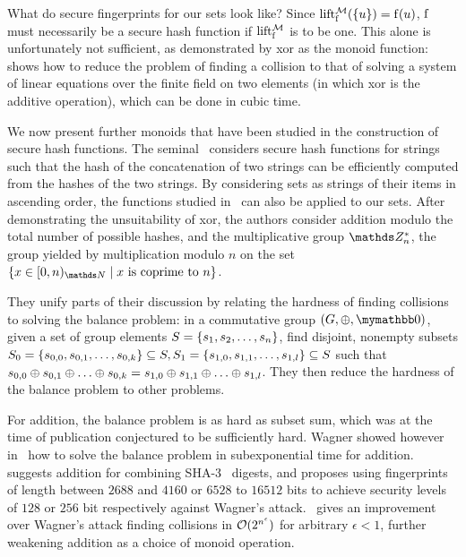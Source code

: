 \documentclass[conference]{IEEEtran}
\begin{document}
What do secure fingerprints for our sets look like? Since $\operatorname{lift_{\operatorname{f}}^{\mathcal{M}}}(\{u\}) = \operatorname{f}(u)$, $\operatorname{f}$ must necessarily be a secure hash function if $\operatorname{lift_{\operatorname{f}}^{\mathcal{M}}}$ is to be one. This alone is unfortunately not sufficient, as demonstrated by xor as the monoid function:~\cite{bellare1997new} shows how to reduce the problem of finding a collision to that of solving a system of linear equations over the finite field on two elements (in which xor is the additive operation), which can be done in cubic time.

We now present further monoids that have been studied in the construction of secure hash functions. The seminal~\cite{bellare1997new} considers secure hash functions for strings such that the hash of the concatenation of two strings can be efficiently computed from the hashes of the two strings. By considering sets as strings of their items in ascending order, the functions studied in~\cite{bellare1997new} can also be applied to our sets. After demonstrating the unsuitability of xor, the authors consider addition modulo the total number of possible hashes, and the multiplicative group $\Z_n^\ast$, the group yielded by multiplication modulo $n$ on the set $\set{x \in \range{0}{n}{\N} \mid \text{$x$ is coprime to $n$}}$.

They unify parts of their discussion by relating the hardness of finding collisions to solving the balance problem: in a commutative group $(G, \groupaddsym, \neutraladd)$, given a set of group elements $S = \{s_1, s_2, \ldots, s_n\}$, find disjoint, nonempty subsets $S_0 = \{s_{0, 0}, s_{0, 1}, \ldots, s_{0, k}\} \subseteq S, S_1 = \{s_{1, 0}, s_{1, 1}, \ldots, s_{1, l}\} \subseteq S$ such that $s_{0, 0} \oplus s_{0, 1}  \oplus \ldots  \oplus s_{0, k} = s_{1, 0}  \oplus s_{1, 1}  \oplus \ldots  \oplus s_{1, l}$. They then reduce the hardness of the balance problem to other problems.

For addition, the balance problem is as hard as subset sum, which was at the time of publication conjectured to be sufficiently hard. Wagner showed however in~\cite{wagner2002generalized} how to solve the balance problem in subexponential time for addition.~ \cite{mihajloska2015reviving} suggests addition for combining SHA-3~\cite{dworkin2015sha} digests, and proposes using fingerprints of length between $2688$ and $4160$ or $6528$ to $16512$ bits to achieve security levels of $128$ or $256$ bit respectively against Wagner's attack.~\cite{lyubashevsky2005parity} gives an improvement over Wagner's attack finding collisions in $\mathcal{O}(2^{n^\epsilon})$ for arbitrary $\epsilon < 1$, further weakening addition as a choice of monoid operation.
\end{document}
